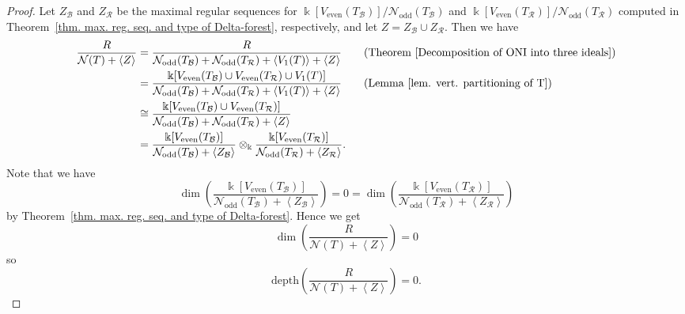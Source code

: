 \documentclass[12pt, reqno]{amsart}
\theoremstyle{definition}
\theoremstyle{plain}
\theoremstyle{definition}
\newcommand{\depth}{\mbox{depth}}
\newcommand{\R}{\mathcal{R}}
\newcommand{\B}{\mathcal{B}}
\newcommand{\kk}{\Bbbk}
\newcommand\gen[1]{\left\langle #1 \right\rangle}
\newcommand{\NN}{\mathcal{N}}
\begin{document}
\begin{proof}
    Let $Z_\B$ and $Z_\R$ be the maximal regular sequences for $\kk[V_{\text{even}}(T_\B)]/\NN_{\text{odd}}(T_\B)$ and $\kk[V_{\text{even}}(T_\R)]/\NN_{\text{odd}}(T_\R)$ computed in Theorem~\ref{thm. max. reg. seq. and type of Delta-forest}, respectively, and let $Z = Z_\B \cup Z_\R$.
    Then we have 
   \begin{align*}
        \frac{R}{\NN(T)+\gen{Z}} &= \frac{R}{\NN_{\text{odd}}(T_\B) + \NN_{\text{odd}}(T_\R) + \gen{V_1(T)}+\gen{Z}} \tag{Theorem~\ref{Decomposition of ONI into three ideals}}\\
        &= \frac{\kk[V_{\text{even}}(T_\B) \cup V_{\text{even}}(T_\R) \cup V_1(T)]}{\NN_{\text{odd}}(T_\B) + \NN_{\text{odd}}(T_\R) + \gen{V_1(T)}+\gen{Z}} \tag{Lemma~\ref{lem. vert. partitioning of T}}\\
        &\cong \frac{\kk[V_{\text{even}}(T_\B) \cup V_{\text{even}}(T_\R)]}{\NN_{\text{odd}}(T_\B) + \NN_{\text{odd}}(T_\R)+\gen{Z}}\\
        &= \frac{\kk[V_{\text{even}}(T_\B)]}{\NN_{\text{odd}}(T_\B)+\gen{Z_\B}} \otimes_\kk \frac{\kk[V_{\text{even}}(T_\R)]}{\NN_{\text{odd}}(T_\R) + \gen{Z_\R}}.
    \end{align*}
    Note that we have 
    $$
    \dim\left(\frac{\kk[V_{\text{even}}(T_\B)]}{\NN_{\text{odd}}(T_\B) + \gen{Z_\B}}\right) =0= \dim\left(\frac{\kk[V_{\text{even}}(T_\R)]}{\NN_{\text{odd}}(T_\R) + \gen{Z_\R}}\right)
    $$
    by Theorem~\ref{thm. max. reg. seq. and type of Delta-forest}.
    Hence we get  
    $$
    \dim\left(\frac{R}{\NN(T)+\gen{Z}}\right) = 0
    $$
    so
    $$
    \depth\left(\frac{R}{\NN(T)+\gen{Z}}\right) = 0.
    $$
    

\end{proof}
\end{document}
